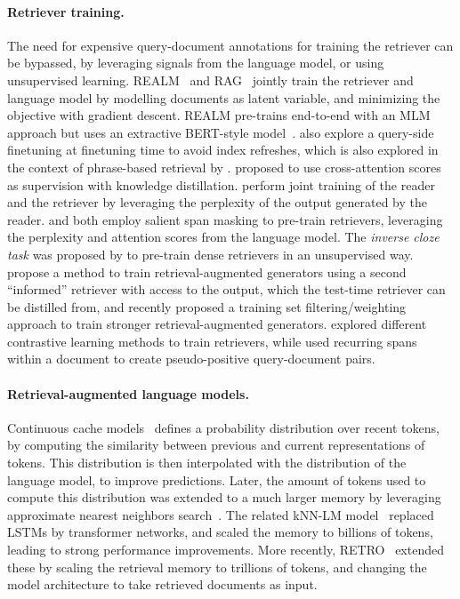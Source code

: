 \documentclass[10pt]{article} \usepackage[preprint]{tmlr}
\begin{document}
\paragraph{Retriever training.}
The need for expensive query-document annotations for training the retriever can be bypassed, by leveraging signals from the language model, or using unsupervised learning.
REALM~\citep{guu2020realm} and RAG~\citep{lewis2020retrieval} jointly train the retriever and language model by modelling documents as latent variable, and minimizing the objective with gradient descent. REALM pre-trains end-to-end with an MLM approach but uses an extractive BERT-style model~\citep{devlin2018bert}. 
\citet{guu2020realm} also explore a query-side finetuning at finetuning time to avoid index refreshes, which is also explored in the context of phrase-based retrieval by \citet {lee-etal-2021-learning-dense}. 
\citet{izacard2020leveraging} proposed to use cross-attention scores as supervision with knowledge distillation.
\citet{emdr} perform joint training of the reader and the retriever by leveraging the perplexity of the output generated by the reader.
\citet{emdr} and \citet{yono} both employ salient span masking to pre-train retrievers, leveraging the perplexity and attention scores from the language model.
The \emph{inverse cloze task} was proposed by \citet{lee2019latent} to pre-train dense retrievers in an unsupervised way.
\citet{paranjape2021hindsight} propose a method to train retrieval-augmented generators using a second ``informed'' retriever with access to the output, which the test-time retriever can be distilled from, and \citet{Hofsttter2022MultiTaskRT} recently proposed a training set filtering/weighting approach to train stronger retrieval-augmented generators. 
\citet{izacard2022unsupervised} explored different contrastive learning methods to train retrievers, while \citet{ram-etal-2022-learning} used recurring spans within a document to create pseudo-positive query-document pairs.

\paragraph{Retrieval-augmented language models.}
Continuous cache models~\citep{graveImproving2016} defines a probability distribution over recent tokens, by computing the similarity between previous and current representations of tokens.
This distribution is then interpolated with the distribution of the language model, to improve predictions.
Later, the amount of tokens used to compute this distribution was extended to a much larger memory by leveraging approximate nearest neighbors search~\citep{grave2017unbounded}.
The related kNN-LM model~\citep{khandelwalGeneralization2020} replaced LSTMs by transformer networks, and scaled the memory to billions of tokens, leading to strong performance improvements.
More recently, RETRO~\citep{borgeaud2021retro} extended these by scaling the retrieval memory to trillions of tokens, and changing the model architecture to take retrieved documents as input.
\end{document}
